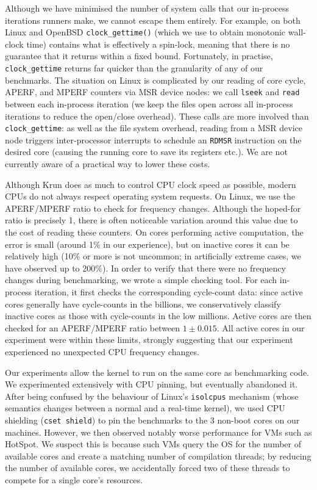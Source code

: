 \documentclass[acmlarge]{acmart}\settopmatter{printfolios=true}
\newcommand{\krun}{Krun\xspace}
\begin{document}
Although we have minimised the number of system calls that our in-process
iterations runners make, we cannot escape them entirely. For example,
on both Linux and OpenBSD \texttt{clock\_gettime()} (which we use to obtain
monotonic wall-clock time) contains what is effectively a spin-lock,
meaning that there is no guarantee that it returns within a fixed bound.
Fortunately, in practise, \texttt{clock\_gettime} returns far quicker than the granularity
of any of our benchmarks. \label{aperf/mperf error} The situation
on Linux is complicated by our reading of core cycle, APERF, and MPERF
counters via MSR device nodes: we call \texttt{lseek} and \texttt{read}
between each in-process iteration (we keep the files open across all
in-process iterations to reduce the open/close overhead).
These calls are more involved than \texttt{clock\_gettime}:
as well as the file system overhead, reading from a MSR device
node triggers inter-processor interrupts to schedule an \texttt{RDMSR}
instruction on the desired core (causing the running core to save its registers etc.).
We are not currently aware of a practical way to lower these costs.

Although \krun does as much to control CPU clock speed as possible, modern CPUs
do not always respect operating system requests. On Linux, we use the
APERF/MPERF ratio to check for frequency changes. Although the hoped-for
ratio is precisely 1, there is often noticeable variation around this value due to the
cost of reading these counters. On cores
performing active computation, the error is small (around 1\% in our
experience), but on inactive cores it can be relatively high (10\% or more is
not uncommon; in artificially extreme cases, we have observed up to 200\%).
In order to verify that there were no frequency changes during benchmarking,
we wrote a simple checking tool. For each in-process iteration, it first checks
the corresponding cycle-count data: since active cores generally have
cycle-counts in the billions, we conservatively classify inactive
cores as those with cycle-counts in the low millions. Active cores are then
checked for an APERF/MPERF ratio between $1 \pm 0.015$. All active cores in our
experiment were within these limits, strongly suggesting that our experiment
experienced no unexpected CPU frequency changes.

Our experiments allow the kernel to run on the same core as benchmarking code.
We experimented extensively with CPU pinning, but eventually abandoned it. After
being confused by the behaviour of Linux's \texttt{isolcpus} mechanism (whose
semantics changes between a normal and a real-time kernel), we used CPU shielding
(\texttt{cset shield}) to pin the benchmarks to the 3 non-boot cores on our
machines. However, we then observed notably worse performance for VMs such as
HotSpot. We suspect this is because such VMs query the OS for the number of
available cores and create a matching number of compilation threads; by reducing
the number of available cores, we accidentally forced two of these threads to
compete for a single core's resources.
\end{document}
